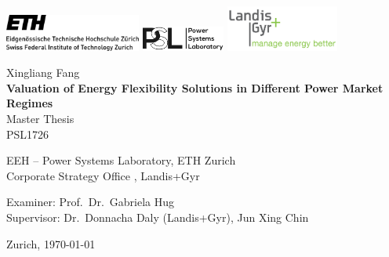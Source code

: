 \begin{titlepage}
\begin{center}

\includegraphics[height=12mm]{Figures/eth_logo_lang_pos}
\hfill
\includegraphics[height=8mm]{Figures/PSL_logo}
\hfill
\includegraphics[height=15mm]{Figures/L+G_logo}

\vspace{30mm} Xingliang Fang \\
\vspace{10mm} \textbf{\LARGE Valuation of Energy Flexibility Solutions in Different Power Market Regimes} \\
\vspace{10mm} Master Thesis \\ PSL1726


\vfill

EEH -- Power Systems Laboratory, ETH Zurich \\
Corporate Strategy Office , Landis+Gyr

\vspace{5mm}

Examiner: Prof.~Dr.~Gabriela Hug \\
Supervisor: Dr.~Donnacha Daly (Landis+Gyr), Jun Xing Chin


\vspace{5mm} Zurich, \today

\end{center}
\end{titlepage}
